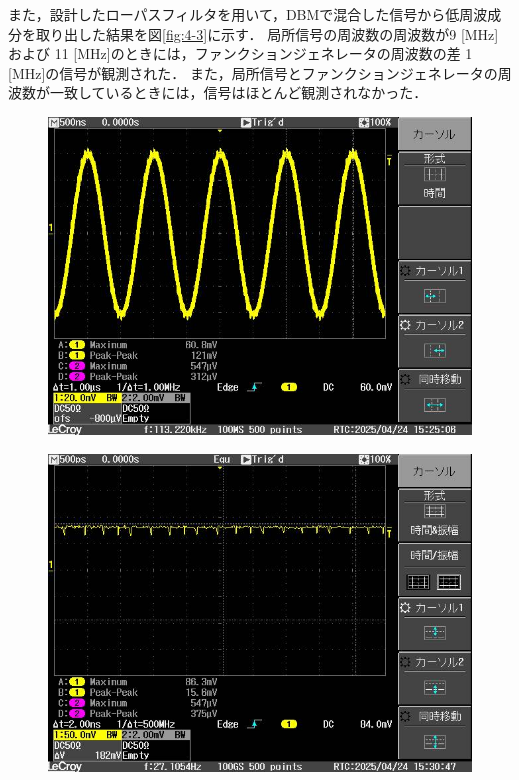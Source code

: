 \documentclass[uplatex,dvipdfmx,a4j,12pt]{jsarticle}
\begin{document}
また，設計したローパスフィルタを用いて，DBMで混合した信号から低周波成分を取り出した結果を図\ref{fig:4-3}に示す．
局所信号の周波数の周波数が9 [MHz]および 11 [MHz]のときには，ファンクションジェネレータの周波数の差 1 [MHz]の信号が観測された．
また，局所信号とファンクションジェネレータの周波数が一致しているときには，信号はほとんど観測されなかった．
\begin{figure}[H]
  \centering
  \begin{minipage}
      [b]{0.45\linewidth}
      \centering
      \includegraphics[width=\linewidth]{img/4_3_9MHz.jpg}
      \label{fig:4-3-a}
  \end{minipage}
  \begin{minipage}
      [b]{0.45\linewidth}
      \centering
      \includegraphics[width=\linewidth]{img/4_3_10MHz.jpg}

\end{minipage}
\end{figure}
\end{document}
